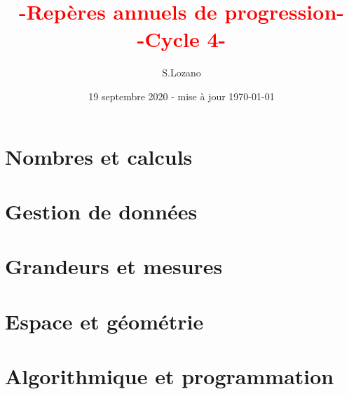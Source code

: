 \documentclass[12pt,french,a4paper]{article}
\title{\textcolor{red}{\sc -Repères annuels de progression-\\-Cycle 4-}}
\author{{\sc S.Lozano}}
\date{19 septembre 2020 - mise à jour \today}
\begin{document}
\maketitle
\thispagestyle{empty}

\section*{Nombres et calculs}

\par\smallskip

\par\smallskip

\par\smallskip

\par\smallskip

\par\smallskip

\par\smallskip

\par\smallskip


\section*{Gestion de données}

\par\smallskip

\par\smallskip

\par\smallskip


\section*{Grandeurs et mesures}

\par\smallskip

\par\smallskip
\section*{Espace et géométrie}

\par\smallskip

\par\smallskip


\section*{Algorithmique et programmation}

\end{document}
